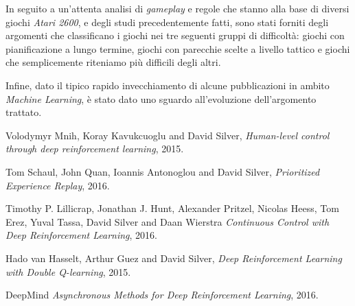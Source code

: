 \documentclass[twoside,twocolumn,10pt]{extarticle}
\theoremstyle{definition}
\begin{document}
		In seguito a un'attenta analisi di \textit{gameplay} e regole che stanno alla base di diversi giochi \textit{Atari 2600}, e degli studi precedentemente fatti, sono stati forniti degli argomenti che classificano i giochi nei tre seguenti gruppi di difficoltà: giochi con pianificazione a lungo termine, giochi con parecchie scelte a livello tattico e giochi che semplicemente riteniamo più difficili degli altri.
		
		Infine, dato il tipico rapido invecchiamento di alcune pubblicazioni in ambito \textit{Machine Learning}, è stato dato uno sguardo all'evoluzione dell'argomento trattato.
	
\begin{thebibliography}{99}	
		Volodymyr Mnih, Koray Kavukcuoglu and David Silver,
		\newblock \emph{Human-level control through deep reinforcement learning},
		2015.
		
		Tom Schaul, John Quan, Ioannis Antonoglou and David Silver,
		\newblock \emph{Prioritized Experience Replay},
		2016.
		
		Timothy P. Lillicrap, Jonathan J. Hunt, Alexander Pritzel, Nicolas Heess,
Tom Erez, Yuval Tassa, David Silver and Daan Wierstra
		\newblock \emph{Continuous Control with Deep Reinforcement Learning},
		2016.
		
		Hado van Hasselt, Arthur Guez and David Silver,
		\newblock \emph{Deep Reinforcement Learning with Double Q-learning},
		2015.
	
		DeepMind
		\newblock \emph{Asynchronous Methods for Deep Reinforcement Learning},
		2016.
\end{thebibliography}
\end{document}
